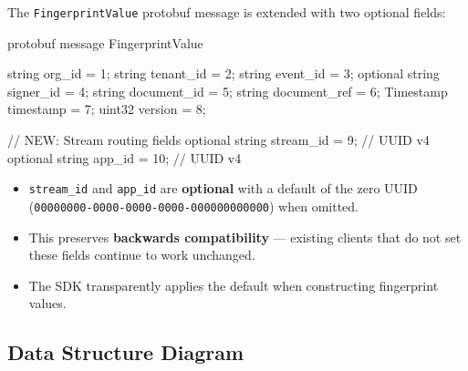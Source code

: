 \documentclass[11pt,a4paper]{article}
\begin{document}
The \texttt{FingerprintValue} protobuf message is extended with two optional fields:

\begin{codebox}{protobuf}
message FingerprintValue {
  string org_id = 1;
  string tenant_id = 2;
  string event_id = 3;
  optional string signer_id = 4;
  string document_id = 5;
  string document_ref = 6;
  Timestamp timestamp = 7;
  uint32 version = 8;

  // NEW: Stream routing fields
  optional string stream_id = 9;   // UUID v4
  optional string app_id = 10;     // UUID v4
}
\end{codebox}

\begin{itemize}
  \item \texttt{stream\_id} and \texttt{app\_id} are \textbf{optional} with a default of
    the zero UUID (\texttt{00000000-0000-0000-0000-000000000000}) when omitted.
  \item This preserves \textbf{backwards compatibility} --- existing clients that do not
    set these fields continue to work unchanged.
  \item The SDK transparently applies the default when constructing fingerprint values.
\end{itemize}

\subsection{Data Structure Diagram}
\end{document}
